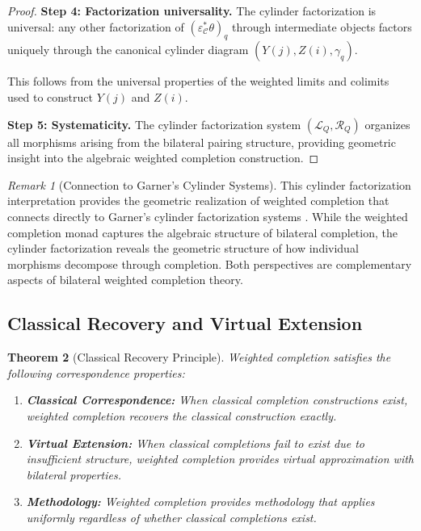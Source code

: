 \documentclass[11pt]{article}
\theoremstyle{plain}
\newtheorem{theorem}{Theorem}[section]
\theoremstyle{definition}
\theoremstyle{remark}
\newtheorem{remark}[theorem]{Remark}
\newcommand{\C}{\mathcal{C}}
\begin{document}
\begin{proof}
\textbf{Step 4: Factorization universality.}
The cylinder factorization is universal: any other factorization of $(\varepsilon_\C^* \theta)_q$ through intermediate objects factors uniquely through the canonical cylinder diagram $(Y(j), Z(i), \gamma_q)$.

This follows from the universal properties of the weighted limits and colimits used to construct $Y(j)$ and $Z(i)$.

\textbf{Step 5: Systematicity.}
The cylinder factorization system $(\mathcal{L}_Q, \mathcal{R}_Q)$ organizes all morphisms arising from the bilateral pairing structure, providing geometric insight into the algebraic weighted completion construction.
\end{proof}

\begin{remark}[Connection to Garner's Cylinder Systems]
This cylinder factorization interpretation provides the geometric realization of weighted completion that connects directly to Garner's cylinder factorization systems \cite{garner2018cylinder}. While the weighted completion monad captures the algebraic structure of bilateral completion, the cylinder factorization reveals the geometric structure of how individual morphisms decompose through completion. Both perspectives are complementary aspects of bilateral weighted completion theory.
\end{remark}

\subsection{Classical Recovery and Virtual Extension}

\begin{theorem}[Classical Recovery Principle]\label{thm:classical-recovery}
Weighted completion satisfies the following correspondence properties:

\begin{enumerate}
\item \textbf{Classical Correspondence:} When classical completion constructions exist, weighted completion recovers the classical construction exactly.

\item \textbf{Virtual Extension:} When classical completions fail to exist due to insufficient structure, weighted completion provides virtual approximation with bilateral properties.

\item \textbf{Methodology:} Weighted completion provides methodology that applies uniformly regardless of whether classical completions exist.
\end{enumerate}
\end{theorem}
\end{document}
